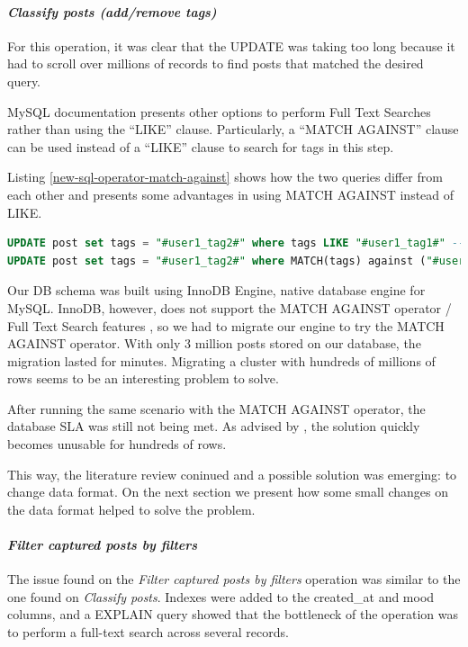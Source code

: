 \paragraph{\textit{Classify posts (add/remove tags)}}
For this operation, it was clear that the UPDATE was taking too long because it had to scroll over millions of records to find posts that matched the desired query. 

MySQL documentation presents other options to perform Full Text Searches rather than using the ``LIKE'' clause. Particularly, a ``MATCH AGAINST'' clause can be used instead of a ``LIKE'' clause to search for tags in this step. 

Listing \ref{new-sql-operator-match-against} shows how the two queries differ from each other and \cite{stackoverflowmatch} presents some advantages in using MATCH AGAINST instead of LIKE.

\begin{lstlisting}[language=SQL,firstnumber=1, caption=A new operator - MATCH AGAINST, label=new-sql-operator-match-against]
UPDATE post set tags = "#user1_tag2#" where tags LIKE "#user1_tag1#" -- old sentence
UPDATE post set tags = "#user1_tag2#" where MATCH(tags) against ("#user1_tag1#" IN BOOLEAN MODE) -- new sentence
\end{lstlisting} 

Our DB schema was built using InnoDB Engine, native database engine for MySQL. InnoDB, however, does not support the MATCH AGAINST operator / Full Text Search features \cite{ftsmysql}, so we had to migrate our engine to try the MATCH AGAINST operator. With only 3 million posts stored on our database, the migration lasted for minutes. Migrating a cluster with hundreds of millions of rows seems to be an interesting problem to solve. 

After running the same scenario with the MATCH AGAINST operator, the database SLA was still not being met. As advised by \cite{stackoverflowmatch}, the solution quickly becomes unusable for hundreds of rows. 

This way, the literature review coninued and a possible solution was emerging: to change data format. On the next section we present how some small changes on the data format helped to solve the problem.  



\paragraph{\textit{Filter captured posts by filters}}
The issue found on the \textit{Filter captured posts by filters} operation was similar to the one found on \textit{Classify posts}. Indexes were added to the created\_at and mood columns, and a EXPLAIN query showed that the bottleneck of the operation was to perform a full-text search across several records. 

